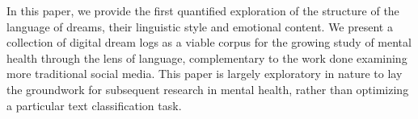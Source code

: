 In this paper, we provide the first quantified exploration of the structure of the language of dreams, their linguistic style and emotional content. We present a collection of digital dream logs as a viable corpus for the growing study of mental health through the lens of language, complementary to the work done examining more traditional social media. This paper is largely exploratory in nature to lay the groundwork for subsequent research in mental health, rather than optimizing a particular text classification task.
